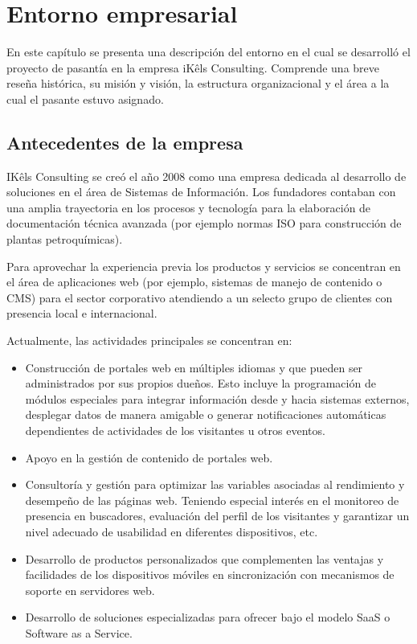 \chapter{Entorno empresarial}
En este capítulo se presenta una descripción del entorno en el cual se desarrolló el proyecto de pasantía en la empresa iKêls Consulting. Comprende una breve reseña histórica, su misión y visión, la estructura organizacional y el área a la cual el pasante estuvo asignado.

\section{Antecedentes de la empresa}
IKêls Consulting se creó el año 2008 como una empresa dedicada al desarrollo de soluciones en el área de Sistemas de Información. Los fundadores contaban con una amplia trayectoria en los procesos y tecnología para la elaboración de documentación técnica avanzada (por ejemplo normas ISO para construcción de plantas petroquímicas).

Para aprovechar la experiencia previa los productos y servicios se concentran en el área de aplicaciones web (por ejemplo, sistemas de manejo de contenido o CMS) para el sector corporativo atendiendo a un selecto grupo de clientes con presencia local e internacional.

Actualmente, las actividades principales se concentran en:

\begin{itemize}
  \item Construcción de portales web en múltiples idiomas y que pueden ser administrados por sus propios dueños. Esto incluye la programación de módulos especiales para integrar información desde y hacia sistemas externos, desplegar datos de manera amigable o generar notificaciones automáticas dependientes de actividades de los visitantes u otros eventos.
  \item Apoyo en la gestión de contenido de portales web.
  \item Consultoría y gestión para optimizar las variables asociadas al rendimiento y desempeño de las páginas web. Teniendo especial interés en el monitoreo de presencia en buscadores, evaluación del perfil de los visitantes y garantizar un nivel adecuado de usabilidad en diferentes dispositivos, etc.
  \item Desarrollo de productos personalizados que complementen las ventajas y facilidades de los dispositivos móviles en sincronización con mecanismos de soporte en servidores web.
  \item Desarrollo de soluciones especializadas para ofrecer bajo el modelo SaaS o Software as a Service.
\end{itemize}

